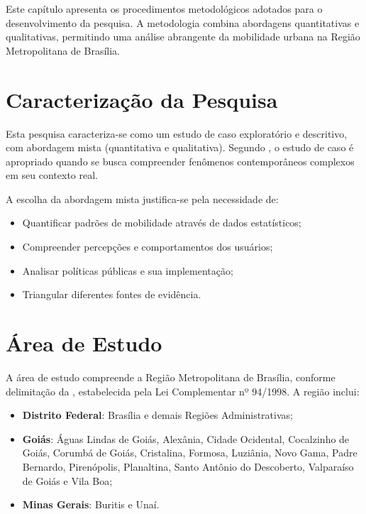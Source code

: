 

Este capítulo apresenta os procedimentos metodológicos adotados para o desenvolvimento da pesquisa. A metodologia combina abordagens quantitativas e qualitativas, permitindo uma análise abrangente da mobilidade urbana na Região Metropolitana de Brasília.

\section{Caracterização da Pesquisa}

Esta pesquisa caracteriza-se como um estudo de caso exploratório e descritivo, com abordagem mista (quantitativa e qualitativa). Segundo \cite{yin2015}, o estudo de caso é apropriado quando se busca compreender fenômenos contemporâneos complexos em seu contexto real.

A escolha da abordagem mista justifica-se pela necessidade de:
\begin{itemize}
    \item Quantificar padrões de mobilidade através de dados estatísticos;
    \item Compreender percepções e comportamentos dos usuários;
    \item Analisar políticas públicas e sua implementação;
    \item Triangular diferentes fontes de evidência.
\end{itemize}

\section{Área de Estudo}

A área de estudo compreende a Região Metropolitana de Brasília, conforme delimitação da , estabelecida pela Lei Complementar nº 94/1998. A região inclui:

\begin{itemize}
    \item \textbf{Distrito Federal}: Brasília e demais Regiões Administrativas;
    \item \textbf{Goiás}: Águas Lindas de Goiás, Alexânia, Cidade Ocidental, Cocalzinho de Goiás, Corumbá de Goiás, Cristalina, Formosa, Luziânia, Novo Gama, Padre Bernardo, Pirenópolis, Planaltina, Santo Antônio do Descoberto, Valparaíso de Goiás e Vila Boa;
    \item \textbf{Minas Gerais}: Buritis e Unaí.
\end{itemize}


